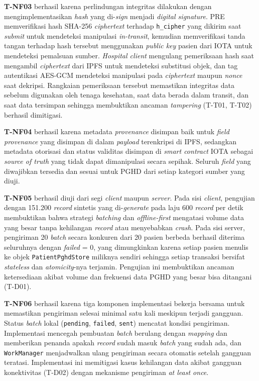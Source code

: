 \textbf{T-NF03} berhasil karena perlindungan integritas dilakukan dengan mengimplementasikan \textit{hash} yang di-\textit{sign} menjadi \textit{digital signature}.
PRE memverifikasi hash SHA-256 \textit{ciphertext} terhadap \texttt{h\_cipher} yang dikirim saat \textit{submit} untuk mendeteksi manipulasi \textit{in-transit}, kemudian memverifikasi tanda tangan terhadap hash tersebut menggunakan \textit{public key} pasien dari IOTA untuk mendeteksi pemalsuan sumber.
\textit{Hospital client} mengulang pemeriksaan hash saat mengambil \textit{ciphertext} dari IPFS untuk mendeteksi substitusi objek, dan tag autentikasi AES-GCM mendeteksi manipulasi pada \textit{ciphertext} maupun \textit{nonce} saat dekripsi.
Rangkaian pemeriksaan tersebut memastikan integritas data sebelum digunakan oleh tenaga kesehatan, saat data berada dalam transit, dan saat data tersimpan sehingga membuktikan ancaman \textit{tampering} (T-T01, T-T02) berhasil dimitigasi.

\textbf{T-NF04} berhasil karena metadata \textit{provenance} disimpan baik untuk \textit{field provenance} yang disimpan di dalam \textit{payload} terenkripsi di IPFS, sedangkan metadata otorisasi dan status validitas disimpan di \textit{smart contract} IOTA sebagai \textit{source of truth} yang tidak dapat dimanipulasi secara sepihak.
Seluruh \textit{field} yang diwajibkan tersedia dan sesuai untuk PGHD dari setiap kategori sumber yang diuji.

\textbf{T-NF05} berhasil diuji dari segi \textit{client} maupun \textit{server}.
Pada sisi \textit{client}, pengujian dengan 151.200 \textit{record} sintetis yang di-\textit{generate} pada laju 600 \textit{record} per detik membuktikan bahwa strategi \textit{batching} dan \textit{offline-first} mengatasi volume data yang besar tanpa kehilangan \textit{record} atau menyebabkan \textit{crash}.
Pada sisi server, pengiriman 20 \textit{batch} secara konkuren dari 20 pasien berbeda berhasil diterima seluruhnya dengan \textit{failed} = 0, yang dimungkinkan karena setiap pasien menulis ke objek \texttt{PatientPghdStore} miliknya sendiri sehingga setiap transaksi bersifat \textit{stateless} dan \textit{atomicity}-nya terjamin.
Pengujian ini membuktikan ancaman ketersediaan akibat volume dan frekuensi data PGHD yang besar bisa ditangani (T-D01).

\textbf{T-NF06} berhasil karena tiga komponen implementasi bekerja bersama untuk memastikan pengiriman selesai minimal satu kali meskipun terjadi gangguan.
Status \textit{batch} lokal (\texttt{pending}, \texttt{failed}, \texttt{sent}) mencatat kondisi pengiriman. 
Implementasi mencegah pembuatan \textit{batch} berulang dengan \textit{mapping} dan memberikan penanda apakah \textit{record} sudah masuk \textit{batch} yang sudah ada, dan \texttt{WorkManager} menjadwalkan ulang pengiriman secara otomatis setelah gangguan teratasi.
Implementasi ini memitigasi kasus kehilangan data akibat gangguan konektivitas (T-D02) dengan mekanisme pengiriman \textit{at least once}.
